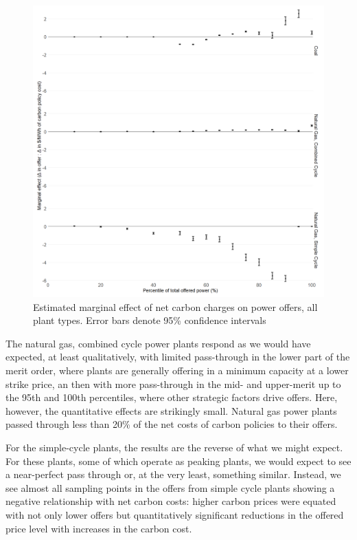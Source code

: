 \documentclass[12pt]{article}
\begin{document}
\begin{figure}[!htb]
    \centering
     \includegraphics[width=.9\textwidth]{../images/by_type_net.png}
    \caption{Estimated marginal effect of net carbon charges on power offers, all plant types. Error bars denote 95\% confidence intervals}
    \label{fig:decomp_peaks}
\end{figure}

The natural gas, combined cycle power plants respond as we would have expected, at least qualitatively, with limited pass-through in the lower part of the merit order, where plants are generally offering in a minimum capacity at a lower strike price, an then with more pass-through in the mid- and upper-merit up to the 95th and 100th percentiles, where other strategic factors drive offers. Here, however, the quantitative effects are strikingly small. Natural gas power plants passed through less than 20\% of the net costs of carbon policies to their offers.

For the simple-cycle plants, the results are the reverse of what we might expect. For these plants, some of which operate as peaking plants, we would expect to see a near-perfect pass through or, at the very least, something similar. Instead, we see almost all sampling points in the offers from simple cycle plants showing a negative relationship with net carbon costs: higher carbon prices were equated with not only lower offers but quantitatively significant reductions in the offered price level with increases in the carbon cost.
\end{document}

